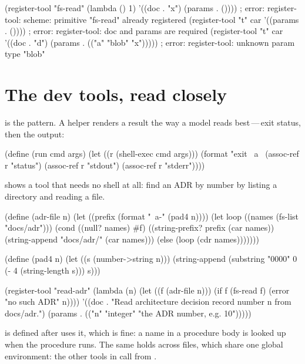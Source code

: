 \begin{scm}
(register-tool "fs-read" (lambda () 1) '((doc . "x") (params . ())))
; error: register-tool: scheme: primitive "fs-read" already registered
(register-tool "t" car '((params . ())))
; error: register-tool: doc and params are required
(register-tool "t" car '((doc . "d") (params . (("a" "blob" "x")))))
; error: register-tool: unknown param type "blob"
\end{scm}

\section{The dev tools, read closely}

 is the pattern. A helper renders a 
result the way a model reads best\,---\,exit status, then the output:

\begin{scm}
(define (run cmd args)
  (let ((r (shell-exec cmd args)))
    (format "exit ~a~%
            (assoc-ref r "status")
            (assoc-ref r "stdout")
            (assoc-ref r "stderr"))))
\end{scm}

 shows a tool that needs no shell at all: find an ADR by
number by listing a directory and reading a file.

\begin{scm}
(define (adr-file n)
  (let ((prefix (format "~a-" (pad4 n))))
    (let loop ((names (fs-list "docs/adr")))
      (cond ((null? names) #f)
            ((string-prefix? prefix (car names)) (string-append "docs/adr/" (car names)))
            (else (loop (cdr names)))))))

(define (pad4 n)
  (let ((s (number->string n)))
    (string-append (substring "0000" 0 (- 4 (string-length s))) s)))

(register-tool "read-adr"
  (lambda (n)
    (let ((f (adr-file n)))
      (if f (fs-read f) (error "no such ADR" n))))
  '((doc . "Read architecture decision record number n from docs/adr.")
    (params . (("n" "integer" "the ADR number, e.g. 10")))))
\end{scm}

 is defined after  uses it, which is fine: a name
in a procedure body is looked up when the procedure runs. The same holds
across files, which share one global environment: the other tools in
 call  from .

